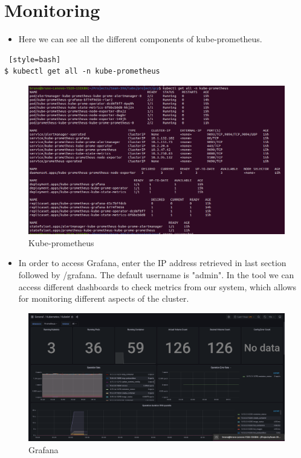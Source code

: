 \documentclass[12pt,a4paper,oneside]{report}
\begin{document}
\clearpage
\section{Monitoring}

\begin{itemize}
    \item Here we can see all the different components of kube-prometheus.
\end{itemize}

\begin{lstlisting} [style=bash]
$ kubectl get all -n kube-prometheus
\end{lstlisting}


\begin{figure}[H]
\centering
\includegraphics[width=1.0\textwidth]{./pictures/prometheus.png}
\caption{Kube-prometheus}
\label{fig:Kube-prometheus}
\end{figure}

\begin{itemize}
    \item In order to access Grafana, enter the IP address retrieved in last section followed by /grafana. The default username is "admin". In the tool we can access different dashboards to check metrics from our system, which allows for monitoring different aspects of the cluster.
\end{itemize}

\begin{figure}[htb]
\centering
\includegraphics[width=1.0\textwidth]{./pictures/grafkubelets.png}
\caption{Grafana}
\label{fig:Grafana}
\end{figure}
\end{document}
